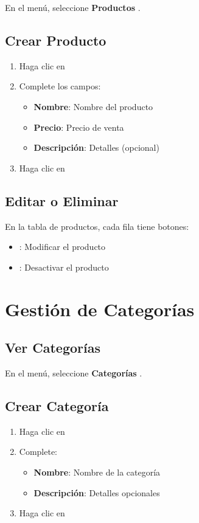 \documentclass[12pt,a4paper]{article}
\begin{document}
En el menú, seleccione \textbf{Productos} \faShoppingCart.

\subsection{Crear Producto}

\begin{enumerate}
    \item Haga clic en 
    \item Complete los campos:
        \begin{itemize}
            \item \textbf{Nombre}: Nombre del producto
            \item \textbf{Precio}: Precio de venta
            \item \textbf{Descripción}: Detalles (opcional)
        \end{itemize}
    \item Haga clic en 
\end{enumerate}

\subsection{Editar o Eliminar}

En la tabla de productos, cada fila tiene botones:
\begin{itemize}
    \item {}: Modificar el producto
    \item {}: Desactivar el producto
\end{itemize}

\newpage

\section{Gestión de Categorías}

\subsection{Ver Categorías}

En el menú, seleccione \textbf{Categorías} \faList.

\subsection{Crear Categoría}

\begin{enumerate}
    \item Haga clic en 
    \item Complete:
        \begin{itemize}
            \item \textbf{Nombre}: Nombre de la categoría
            \item \textbf{Descripción}: Detalles opcionales
        \end{itemize}
    \item Haga clic en 
\end{enumerate}
\end{document}
